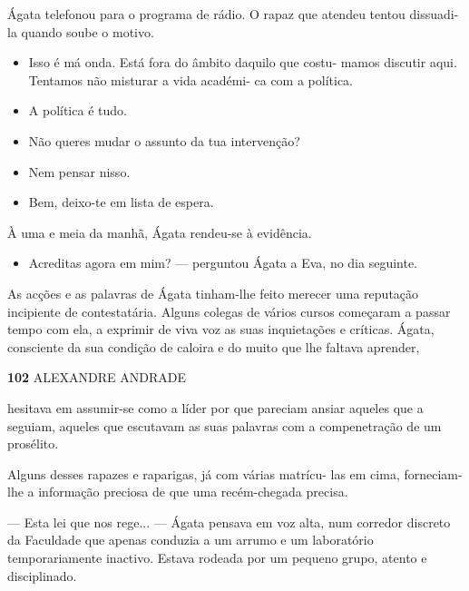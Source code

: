 Ágata telefonou para o programa de rádio. O rapaz que atendeu tentou
dissuadi-la quando soube o motivo.

\begin{itemize}
\tightlist
\item
  Isso é má onda. Está fora do âmbito daquilo que costu- mamos discutir
  aqui. Tentamos não misturar a vida académi- ca com a política.
\item
  A política é tudo.
\item
  Não queres mudar o assunto da tua intervenção?
\item
  Nem pensar nisso.
\item
  Bem, deixo-te em lista de espera.
\end{itemize}

À uma e meia da manhã, Ágata rendeu-se à evidência.

\begin{itemize}
\tightlist
\item
  Acreditas agora em mim? --- perguntou Ágata a Eva, no dia seguinte.
\end{itemize}

As acções e as palavras de Ágata tinham-lhe feito merecer uma reputação
incipiente de contestatária. Alguns colegas de vários cursos começaram a
passar tempo com ela, a exprimir de viva voz as suas inquietações e
críticas. Ágata, consciente da sua condição de caloira e do muito que
lhe faltava aprender,

\textbf{102 }ALEXANDRE ANDRADE

hesitava em assumir-se como a líder por que pareciam ansiar aqueles que
a seguiam, aqueles que escutavam as suas palavras com a compenetração de
um prosélito.

Alguns desses rapazes e raparigas, já com várias matrícu- las em cima,
forneciam-lhe a informação preciosa de que uma recém-chegada precisa.

--- Esta lei que nos rege... --- Ágata pensava em voz alta, num corredor
discreto da Faculdade que apenas conduzia a um arrumo e um laboratório
temporariamente inactivo. Estava rodeada por um pequeno grupo, atento e
disciplinado.

